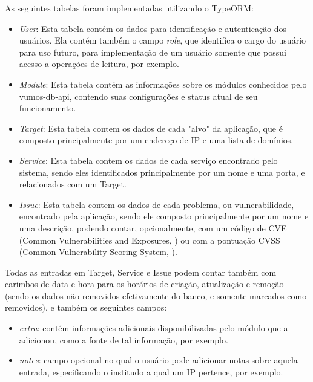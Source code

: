    As seguintes tabelas foram implementadas utilizando o TypeORM:
    \begin{itemize}
        \item \emph{User}: Esta tabela contém os dados para identificação e autenticação dos usuários. Ela contém também o campo \textit{role}, que identifica o cargo do usuário para uso futuro, para implementação de um usuário somente que possui acesso a operações de leitura, por exemplo.
        
        \item \emph{Module}: Esta tabela contém as informações sobre os módulos conhecidos pelo vumos-db-api, contendo suas configurações e status atual de seu funcionamento.
        
        \item \emph{Target}: Esta tabela contem os dados de cada "alvo" da aplicação, que é composto principalmente por um endereço de IP e uma lista de domínios.
        
        \item \emph{Service}: Esta tabela contem os dados de cada serviço encontrado pelo sistema, sendo eles identificados principalmente por um nome e uma porta, e relacionados com um Target.
        
        \item \emph{Issue}: Esta tabela contem os dados de cada problema, ou vulnerabilidade, encontrado pela aplicação, sendo ele composto principalmente por um nome e uma descrição, podendo contar, opcionalmente, com um código de CVE (Common Vulnerabilities and Exposures, \cite{mell2002use}) ou com a pontuação CVSS (Common Vulnerability Scoring System, \cite{scarfone2009analysis}).
    \end{itemize}
    
    Todas as entradas em Target, Service e Issue podem contar também com carimbos de data e hora para os horários de criação, atualização e remoção (sendo os dados não removidos efetivamente do banco, e somente marcados como removidos), e também os seguintes campos: 
    \begin{itemize}
        \item \emph{extra}: contém informações adicionais disponibilizadas pelo módulo que a adicionou, como a fonte de tal informação, por exemplo.
        \item \emph{notes}: campo opcional no qual o usuário pode adicionar notas sobre aquela entrada, especificando o institudo a qual um IP pertence, por exemplo.
    \end{itemize}
    

